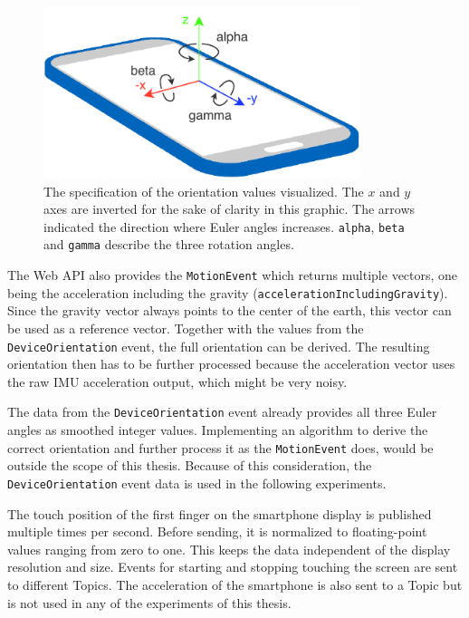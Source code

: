 \begin{figure}[H]
	\centering
	\includegraphics[height=5cm]{figures/implementation/webapi_device_orientation.pdf}
	\caption[Smart device coordinate system and orientation values]{The specification of the orientation values visualized. The \(x\) and \(y\) axes are inverted for the sake of clarity in this graphic. The arrows indicated the direction where Euler angles increases. \lstinline{alpha}, \lstinline{beta} and \lstinline{gamma} describe the three rotation angles.}\label{fig:webapi-device-orientation}
\end{figure}

The Web \gls{API} also provides the \lstinline{MotionEvent} which returns multiple vectors, one being the acceleration including the gravity (\lstinline{accelerationIncludingGravity}). Since the gravity vector always points to the center of the earth, this vector can be used as a reference vector. Together with the values from the \lstinline{DeviceOrientation} event, the full orientation can be derived. The resulting orientation then has to be further processed because the acceleration vector uses the raw \gls{IMU} acceleration output, which might be very noisy.

The data from the \lstinline{DeviceOrientation} event already provides all three Euler angles as smoothed integer values. Implementing an algorithm to derive the correct orientation and further process it as the \lstinline{MotionEvent} does, would be outside the scope of this thesis. Because of this consideration, the \lstinline{DeviceOrientation} event data is used in the following experiments.

The touch position of the first finger on the smartphone display is published multiple times per second. Before sending, it is normalized to floating-point values ranging from zero to one. This keeps the data independent of the display resolution and size. Events for starting and stopping touching the screen are sent to different Topics. The acceleration of the smartphone is also sent to a Topic but is not used in any of the experiments of this thesis.


